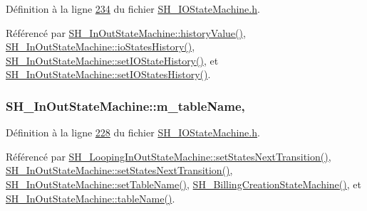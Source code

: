 Définition à la ligne \hyperlink{SH__IOStateMachine_8h_source_l00234}{234} du fichier \hyperlink{SH__IOStateMachine_8h_source}{S\-H\-\_\-\-I\-O\-State\-Machine.\-h}.



Référencé par \hyperlink{classSH__InOutStateMachine_af71bfdb3b59b7bf2763588b513b4205f}{S\-H\-\_\-\-In\-Out\-State\-Machine\-::history\-Value()}, \hyperlink{classSH__InOutStateMachine_a13889998c6dcd17db984dd6ed1454e80}{S\-H\-\_\-\-In\-Out\-State\-Machine\-::io\-States\-History()}, \hyperlink{classSH__InOutStateMachine_acbcce2c4300af1634d928b30e5e9be1c}{S\-H\-\_\-\-In\-Out\-State\-Machine\-::set\-I\-O\-State\-History()}, et \hyperlink{classSH__InOutStateMachine_af51f92c37d00a4eec4da42113cfd7d73}{S\-H\-\_\-\-In\-Out\-State\-Machine\-::set\-I\-O\-States\-History()}.

\hypertarget{classSH__InOutStateMachine_aa009eecc5ab6181358faafb5996b6006}{
\subsubsection[{m\-\_\-table\-Name}]{\setlength{\rightskip}{0pt plus 5cm}S\-H\-\_\-\-In\-Out\-State\-Machine\-::m\-\_\-table\-Name\hspace{0.3cm}{\ttfamily [protected]}, {\ttfamily [inherited]}}}\label{classSH__InOutStateMachine_aa009eecc5ab6181358faafb5996b6006}


Définition à la ligne \hyperlink{SH__IOStateMachine_8h_source_l00228}{228} du fichier \hyperlink{SH__IOStateMachine_8h_source}{S\-H\-\_\-\-I\-O\-State\-Machine.\-h}.



Référencé par \hyperlink{classSH__LoopingInOutStateMachine_a0ee122553641721012f3710e71cce234}{S\-H\-\_\-\-Looping\-In\-Out\-State\-Machine\-::set\-States\-Next\-Transition()}, \hyperlink{classSH__InOutStateMachine_a70d6d81c0a8d4afd6aab0a7239edc237}{S\-H\-\_\-\-In\-Out\-State\-Machine\-::set\-States\-Next\-Transition()}, \hyperlink{classSH__InOutStateMachine_a95db31a7e7f31f36a8737adc739ab08c}{S\-H\-\_\-\-In\-Out\-State\-Machine\-::set\-Table\-Name()}, \hyperlink{classSH__BillingCreationStateMachine_ad62b77fa4aeafe200056ff3974562f83}{S\-H\-\_\-\-Billing\-Creation\-State\-Machine()}, et \hyperlink{classSH__InOutStateMachine_a4288a6c86ddf83effefff886675591c9}{S\-H\-\_\-\-In\-Out\-State\-Machine\-::table\-Name()}.



